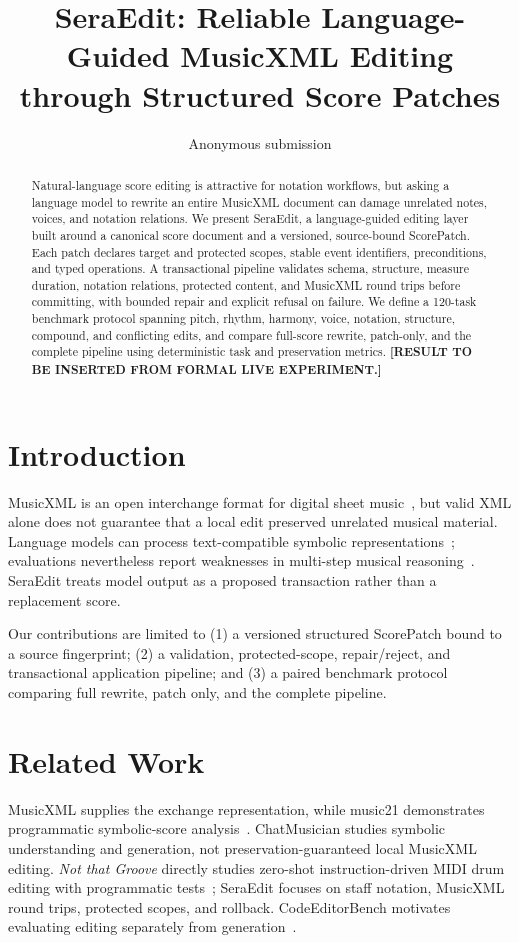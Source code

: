 \documentclass[9pt,twocolumn]{article}
\title{\vspace{-1.8em}SeraEdit: Reliable Language-Guided MusicXML Editing through Structured Score Patches\vspace{-0.7em}}
\author{Anonymous submission}
\date{}
\begin{document}
\maketitle
\vspace{-1.4em}
\begin{abstract}
Natural-language score editing is attractive for notation workflows, but asking a language model to rewrite an entire MusicXML document can damage unrelated notes, voices, and notation relations. We present SeraEdit, a language-guided editing layer built around a canonical score document and a versioned, source-bound ScorePatch. Each patch declares target and protected scopes, stable event identifiers, preconditions, and typed operations. A transactional pipeline validates schema, structure, measure duration, notation relations, protected content, and MusicXML round trips before committing, with bounded repair and explicit refusal on failure. We define a 120-task benchmark protocol spanning pitch, rhythm, harmony, voice, notation, structure, compound, and conflicting edits, and compare full-score rewrite, patch-only, and the complete pipeline using deterministic task and preservation metrics. \textbf{[RESULT TO BE INSERTED FROM FORMAL LIVE EXPERIMENT.]}
\end{abstract}

\section{Introduction}
MusicXML is an open interchange format for digital sheet music~\cite{good2021musicxml}, but valid XML alone does not guarantee that a local edit preserved unrelated musical material. Language models can process text-compatible symbolic representations~\cite{yuan2024chatmusician}; evaluations nevertheless report weaknesses in multi-step musical reasoning~\cite{zhou2024reason}. SeraEdit treats model output as a proposed transaction rather than a replacement score.

Our contributions are limited to (1) a versioned structured ScorePatch bound to a source fingerprint; (2) a validation, protected-scope, repair/reject, and transactional application pipeline; and (3) a paired benchmark protocol comparing full rewrite, patch only, and the complete pipeline.

\section{Related Work}
MusicXML supplies the exchange representation, while music21 demonstrates programmatic symbolic-score analysis~\cite{cuthbert2010music21}. ChatMusician studies symbolic understanding and generation, not preservation-guaranteed local MusicXML editing. \emph{Not that Groove} directly studies zero-shot instruction-driven MIDI drum editing with programmatic tests~\cite{zhang2025groove}; SeraEdit focuses on staff notation, MusicXML round trips, protected scopes, and rollback. CodeEditorBench motivates evaluating editing separately from generation~\cite{guo2024codeeditorbench}.
\end{document}
